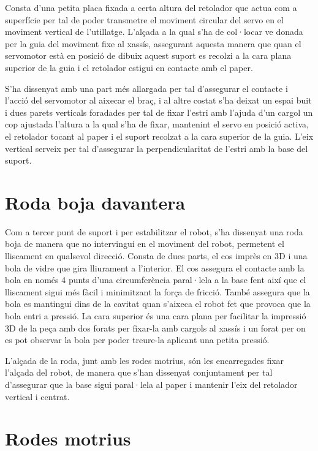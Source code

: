 Consta d’una petita placa fixada a certa altura del retolador que actua com a superfície per tal de poder transmetre el moviment circular del servo en el moviment vertical de l’utillatge. L’alçada a la qual s’ha de col·locar ve donada per la guia del moviment fixe al xassís, assegurant aquesta manera que quan el servomotor està en posició de dibuix aquest suport es recolzi a la cara plana superior de la guia i el retolador estigui en contacte amb el paper. 

S’ha dissenyat amb una part més allargada per tal d’assegurar el contacte i l’acció del servomotor al aixecar el braç, i al altre costat s’ha deixat un espai buit i dues parets verticals foradades per tal de fixar l’estri amb l’ajuda d’un cargol un cop ajustada l'altura a la qual s'ha de fixar, mantenint el servo en posició activa, el retolador tocant al paper i el suport recolzat a la cara superior de la guia. L’eix vertical serveix per tal d’assegurar la perpendicularitat de l’estri amb la base del suport. 

\section{Roda boja davantera}

Com a tercer punt de suport i per estabilitzar el robot, s’ha dissenyat una roda boja de manera que no intervingui en el moviment del robot, permetent el lliscament en qualsevol direcció. Consta de dues parts, el cos imprès en 3D i una bola de vidre que gira lliurament a l'interior. El cos assegura el contacte amb la bola en només 4 punts d’una circumferència paral·lela a la base fent així que el lliscament sigui més fàcil i minimitzant la força de fricció. També assegura que la bola es mantingui dins de la cavitat quan s’aixeca el robot fet que provoca que la bola entri a pressió. La cara superior és una cara plana per facilitar la impressió 3D de la peça amb dos forats per fixar-la amb cargols al xassís i un forat per on es pot observar la bola per poder treure-la aplicant una petita pressió. 

L’alçada de la roda, junt amb les rodes motrius, són les encarregades fixar l’alçada del robot, de manera que s’han dissenyat conjuntament per tal d’assegurar que la base sigui paral·lela al paper i mantenir l’eix del retolador vertical i centrat. 

\section{Rodes motrius}

